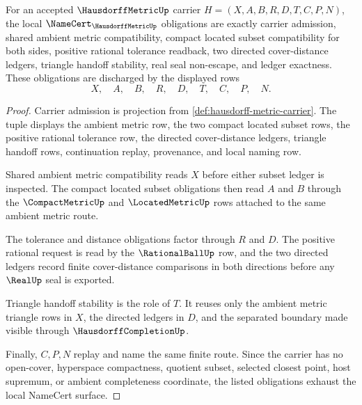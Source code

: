 \begin{theorem}
\label{thm:hausdorff-metric-namecert-obligations}
For an accepted $\HausdorffMetricUp$ carrier $H=(X,A,B,R,D,T,C,P,N)$, the local $\NameCert_{\HausdorffMetricUp}$ obligations are exactly carrier admission, shared ambient metric compatibility, compact located subset compatibility for both sides, positive rational tolerance readback, two directed cover-distance ledgers, triangle handoff stability, real seal non-escape, and ledger exactness. These obligations are discharged by the displayed rows
$$
X,\quad A,\quad B,\quad R,\quad D,\quad T,\quad C,\quad P,\quad N .
$$
\end{theorem}
\begin{proof}
Carrier admission is projection from \autoref{def:hausdorff-metric-carrier}. The tuple displays the ambient metric row, the two compact located subset rows, the positive rational tolerance row, the directed cover-distance ledgers, triangle handoff rows, continuation replay, provenance, and local naming row.

Shared ambient metric compatibility reads $X$ before either subset ledger is inspected. The compact located subset obligations then read $A$ and $B$ through the $\CompactMetricUp$ and $\LocatedMetricUp$ rows attached to the same ambient metric route.

The tolerance and distance obligations factor through $R$ and $D$. The positive rational request is read by the $\RationalBallUp$ row, and the two directed ledgers record finite cover-distance comparisons in both directions before any $\RealUp$ seal is exported.

Triangle handoff stability is the role of $T$. It reuses only the ambient metric triangle rows in $X$, the directed ledgers in $D$, and the separated boundary made visible through $\HausdorffCompletionUp$.

Finally, $C,P,N$ replay and name the same finite route. Since the carrier has no open-cover, hyperspace compactness, quotient subset, selected closest point, host supremum, or ambient completeness coordinate, the listed obligations exhaust the local NameCert surface.
\end{proof}

